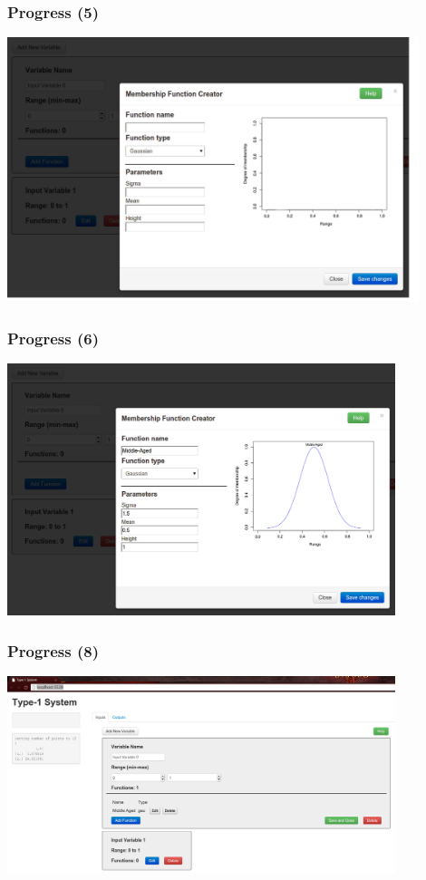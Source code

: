 \documentclass{beamer}
\begin{document}
\begin{frame}
 \frametitle{Progress (5)}
 \begin{mdframed}
 \begin{center}
 \includegraphics[width=0.9\textwidth]{images/fuz8.png}
 \end{center} 
 \end{mdframed}
\end{frame}
\begin{frame}
 \frametitle{Progress (6)}
 \begin{mdframed}
 \begin{center}
 \includegraphics[width=0.85\textwidth]{images/fuz9.png}
 \end{center} 
 \end{mdframed}
\end{frame}

\begin{frame}
 \frametitle{Progress (8)}
 \begin{mdframed}
 \begin{center}
 \includegraphics[width=0.85\textwidth]{images/fuz10.png}
 \end{center} 
 \end{mdframed}
\end{frame}
\end{document}
